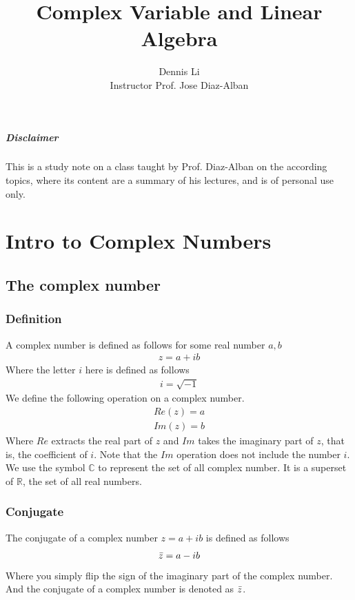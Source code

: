 \documentclass[12pt]{book}
\title{\textbf{Complex Variable and Linear Algebra}}
\author{Dennis Li\\Instructor Prof. Jose Diaz-Alban}
\newcommand{\R}{\mathbb{R}}
\newcommand{\C}{\mathbb{C}}
\begin{document}
\maketitle
\paragraph{Disclaimer} This is a study note on a class taught by Prof. Diaz-Alban on the according topics, where its content are a summary of his lectures, and is of personal use only.

\tableofcontents

\chapter{Intro to Complex Numbers}

\section{The complex number}
\subsection{Definition}
A complex number is defined as follows for some real number $a,b$
\begin{align}
    z = a+ib
\end{align}
Where the letter $i$ here is defined as follows
\begin{align}
    i = \sqrt{-1}
\end{align}
We define the following operation on a complex number.
\begin{align}
    Re(z) = a\\
    Im(z) = b
\end{align}
Where $Re$ extracts the real part of $z$ and $Im$ takes the imaginary part of $z$, that is, the coefficient of $i$. Note that the $Im$ operation does not include the number $i$. We use the symbol $\C$ to represent the set of all complex number. It is a superset of $\R$, the set of all real numbers. 
\subsection{Conjugate}
The conjugate of a complex number $z = a+ib$ is defined as follows
\begin{align}
    \Bar{z} = a - ib
\end{align}
Where you simply flip the sign of the imaginary part of the complex number. And the conjugate of a complex number is denoted as $\Bar{z}$.
\end{document}
